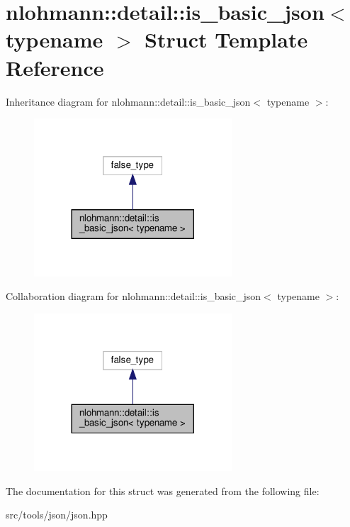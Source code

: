 \hypertarget{structnlohmann_1_1detail_1_1is__basic__json}{}\section{nlohmann\+:\+:detail\+:\+:is\+\_\+basic\+\_\+json$<$ typename $>$ Struct Template Reference}
\label{structnlohmann_1_1detail_1_1is__basic__json}


Inheritance diagram for nlohmann\+:\+:detail\+:\+:is\+\_\+basic\+\_\+json$<$ typename $>$\+:
\nopagebreak
\begin{figure}[H]
\begin{center}
\leavevmode
\includegraphics[width=209pt]{structnlohmann_1_1detail_1_1is__basic__json__inherit__graph}
\end{center}
\end{figure}


Collaboration diagram for nlohmann\+:\+:detail\+:\+:is\+\_\+basic\+\_\+json$<$ typename $>$\+:
\nopagebreak
\begin{figure}[H]
\begin{center}
\leavevmode
\includegraphics[width=209pt]{structnlohmann_1_1detail_1_1is__basic__json__coll__graph}
\end{center}
\end{figure}


The documentation for this struct was generated from the following file\+:\begin{DoxyCompactItemize}
\item 
src/tools/json/json.\+hpp\end{DoxyCompactItemize}
